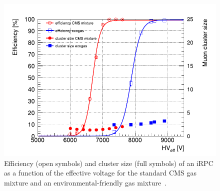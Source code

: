 	\begin{figure}[H]
		\centering
		\includegraphics[width=0.7\linewidth]{fig/chapt4/iRPC-HFO-mixture.pdf}
		\caption{\label{fig:iRPC-eco} Efficiency (open symbols) and cluster size (full symbols) of an iRPC as a function of the effective voltage for the standard CMS gas mixture and an environmental-friendly gas mixture~\cite{PHASEIITP}.}
	\end{figure}

\clearpage{\pagestyle{empty}\cleardoublepage}